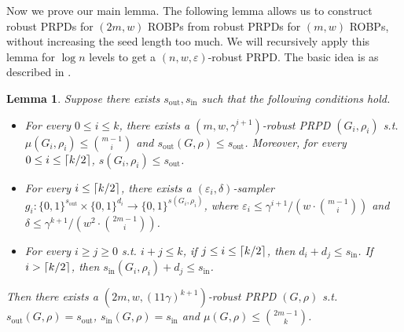 \documentclass[10pt,a4paper]{article}
\newtheorem{lemma}[theorem]{Lemma}
\DeclarePairedDelimiter\ceil{\lceil}{\rceil}
\newcommand{\bits}[1]{\{0,1\}^{#1}}
\newcommand{\eps}{\varepsilon}
\newcommand{\wt}{\mu}
\newcommand{\sout}[1][]{s_{\mathrm{out}#1}}
\newcommand{\si}[1][]{s_{\mathrm{in}#1}}
\begin{document}
\noindent
Now we prove our main lemma. The following lemma allows us to construct robust PRPDs for $(2m,w)$ ROBPs from robust PRPDs for $(m,w)$ ROBPs, without increasing the seed length too much. We will recursively apply this lemma for $\log n$ levels to get a $(n,w,\eps)$-robust PRPD. The basic idea is as described in .
\begin{lemma}\label{lemma:main-approx}
Suppose there exists $\sout,\si$ such that the following conditions hold.
\begin{itemize}
\item
For every $0\le i\le k$, there exists a $(m,w,\gamma^{i+1})$-robust PRPD $(G_i,\rho_i)$ s.t. $\wt(G_i,\rho_i)\le \binom{m-1}{i}$ and $\sout(G,\rho)\le \sout$. Moreover, for every $0\le i\le \ceil{k/2}$, $s(G_i,\rho_i) \le \sout$.
\item
For every $i\le \ceil{k/2}$, there exists a $(\eps_i,\delta)$-sampler $g_i:\bits{\sout}\times\bits{d_i}\to\bits{s(G_i,\rho_i)}$, where $\eps_i\le \gamma^{i+1}/(w\cdot\binom{m-1}{i})$ and $\delta\le \gamma^{k+1}/(w^2\cdot \binom{2m-1}{i})$.
\item
For every $i\ge j\ge 0$ s.t. $i+j\le k$, if $j\le i\le \ceil{k/2}$, then $d_i+d_j\le \si$. If $i>\ceil{k/2}$, then $\si(G_i,\rho_i)+d_j\le \si $.
\end{itemize}
Then there exists a $(2m,w,(11\gamma)^{k+1})$-robust PRPD $(G,\rho)$ s.t. $\sout(G,\rho)=\sout$, $\si(G,\rho)=\si$ and $\wt(G,\rho)\le \binom{2m-1}{k}$.
\end{lemma}
\end{document}
